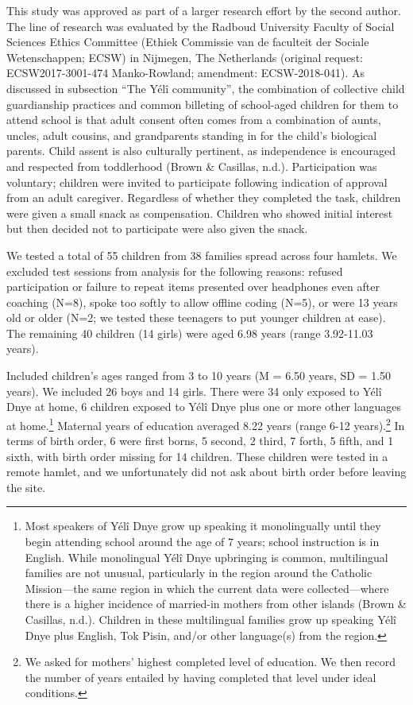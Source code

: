 \documentclass[english,,man,floatsintext]{apa6}
\begin{document}
This study was approved as part of a larger research effort by the second author. The line of research was evaluated by the Radboud University Faculty of Social Sciences Ethics Committee (Ethiek Commissie van de faculteit der Sociale Wetenschappen; ECSW) in Nijmegen, The Netherlands (original request: ECSW2017-3001-474 Manko-Rowland; amendment: ECSW-2018-041). As discussed in subsection \enquote{The Yélî community}, the combination of collective child guardianship practices and common billeting of school-aged children for them to attend school is that adult consent often comes from a combination of aunts, uncles, adult cousins, and grandparents standing in for the child's biological parents. Child assent is also culturally pertinent, as independence is encouraged and respected from toddlerhood (Brown \& Casillas, n.d.). Participation was voluntary; children were invited to participate following indication of approval from an adult caregiver. Regardless of whether they completed the task, children were given a small snack as compensation. Children who showed initial interest but then decided not to participate were also given the snack.

We tested a total of 55 children from 38 families spread across four hamlets. We excluded test sessions from analysis for the following reasons: refused participation or failure to repeat items presented over headphones even after coaching (N=8), spoke too softly to allow offline coding (N=5), or were 13 years old or older (N=2; we tested these teenagers to put younger children at ease). The remaining 40 children (14 girls) were aged 6.98 years (range 3.92-11.03 years).

Included children's ages ranged from 3 to 10 years (M = 6.50 years, SD = 1.50 years). We included 26 boys and 14 girls. There were 34 only exposed to Yélî Dnye at home, 6 children exposed to Yélî Dnye plus one or more other languages at home.\footnote{Most speakers of Yélî Dnye grow up speaking it monolingually until they begin attending school around the age of 7 years; school instruction is in English. While monolingual Yélî Dnye upbringing is common, multilingual families are not unusual, particularly in the region around the Catholic Mission---the same region in which the current data were collected---where there is a higher incidence of married-in mothers from other islands (Brown \& Casillas, n.d.). Children in these multilingual families grow up speaking Yélî Dnye plus English, Tok Pisin, and/or other language(s) from the region.} Maternal years of education averaged 8.22 years (range 6-12 years).\footnote{We asked for mothers' highest completed level of education. We then record the number of years entailed by having completed that level under ideal conditions.} In terms of birth order, 6 were first borns, 5 second, 2 third, 7 forth, 5 fifth, and 1 sixth, with birth order missing for 14 children. These children were tested in a remote hamlet, and we unfortunately did not ask about birth order before leaving the site.
\end{document}

